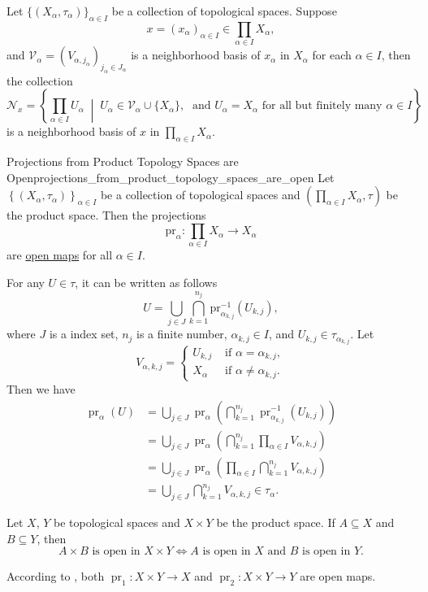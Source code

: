 \documentclass{report}
\begin{document}
\begin{proposition}{}{}
	Let $\{(X_\alpha,\tau_\alpha)\}_{\alpha\in I}$ be a collection of topological spaces. Suppose 
	\[
	   x=(x_\alpha)_{\alpha\in I}\in \prod_{\alpha\in I}X_\alpha,
	\]
	and $\mathcal{V}_\alpha=\left(V_{\alpha, j_\alpha}\right)_{j_\alpha\in J_\alpha}$ is a neighborhood basis of $x_\alpha$ in $X_\alpha$ for each $\alpha\in I$, then the collection
	\[
		\mathcal{N}_x =\left\{\prod_{\alpha\in I}U_{\alpha} \;\middle|\; U_\alpha\in \mathcal{V}_\alpha\cup\{X_\alpha\},\;\text{ and }U_{\alpha}=X_\alpha\text{ for all but finitely many }\alpha\in I\right\}
	\]
	is a neighborhood basis of $x$ in $\prod_{\alpha\in I}X_\alpha$.
\end{proposition}

\begin{proposition}{Projections from Product Topology Spaces are Open}{projections_from_product_topology_spaces_are_open}
	Let $\left\{(X_\alpha,\tau_\alpha)\right\}_{\alpha\in I}$ be a collection of topological spaces and $\left(\prod_{\alpha\in I}X_\alpha,\tau\right)$ be the product space. Then the projections 
	\[
	\mathrm{pr}_\alpha:\prod_{\alpha\in I}X_\alpha \to X_\alpha
	\]
	are \hyperref[th:open_map]{open maps} for all $\alpha\in I$.
\end{proposition}
\begin{prf}
	For any $U\in \tau$, it can be written as follows
	\[
		U = \bigcup_{j \in J} \bigcap_{k  = 1}^{n_j} \mathrm{pr}_{\alpha_{k, j} }^{-1}\left(U_{k, j} \right),
	\]
	where $J$ is a index set, $n_j$ is a finite number, $\alpha_{k, j} \in I$, and $U_{k, j} \in \tau_{\alpha_{k, j}}$. Let
	\[
		V_{\alpha, k, j} = \begin{cases}
			U_{k, j} & \text{ if } \alpha = \alpha_{k, j}, \\
			 X_{\alpha} & \text{ if }\alpha \ne \alpha_{k, j} .
			\end{cases}
	\]
	Then we have
	\begin{align*}
		\operatorname{pr}_\alpha(U)&=\bigcup_{j \in J} \operatorname{pr}_\alpha\left(\bigcap_{k=1}^{n_j} \operatorname{pr}_{\alpha_{k,j}}^{-1}\left(U_{k,j}\right)\right)\\
		&=\bigcup_{j \in J} \operatorname{pr}_\alpha\left(\bigcap_{k=1}^{n_j} \prod_{\alpha\in I}V_{\alpha,k,j}\right)\\
		&=\bigcup_{j \in J} \operatorname{pr}_\alpha\left(\prod_{\alpha\in I}\bigcap_{k=1}^{n_j} V_{\alpha,k,j}\right)\\
		&=\bigcup_{j \in J} \bigcap_{k=1}^{n_j} V_{\alpha,k,j}\in \tau_\alpha.
	\end{align*}
\end{prf}
\begin{corollary}{}{}
	Let $X$, $Y$ be topological spaces and $X\times Y$ be the product space. If $A\subseteq X$ and $B\subseteq Y$, then 
	\[
		A\times B\text{ is open in }X\times Y\iff A\text{ is open in }X\text{ and }B\text{ is open in }Y.
	\]
\end{corollary}
\begin{prf}
	According to , both $\operatorname{pr}_1:X\times Y\to X$ and $\operatorname{pr}_2:X\times Y\to Y$ are open maps.
\end{prf}
\end{document}

